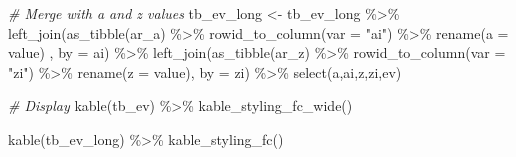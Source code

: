 \documentclass[
]{book}
\newenvironment{Shaded}{\begin{snugshade}}{\end{snugshade}}
\newcommand{\AttributeTok}[1]{\textcolor[rgb]{0.77,0.63,0.00}{#1}}
\newcommand{\CommentTok}[1]{\textcolor[rgb]{0.56,0.35,0.01}{\textit{#1}}}
\newcommand{\FunctionTok}[1]{\textcolor[rgb]{0.00,0.00,0.00}{#1}}
\newcommand{\NormalTok}[1]{#1}
\newcommand{\OtherTok}[1]{\textcolor[rgb]{0.56,0.35,0.01}{#1}}
\newcommand{\SpecialCharTok}[1]{\textcolor[rgb]{0.00,0.00,0.00}{#1}}
\newcommand{\StringTok}[1]{\textcolor[rgb]{0.31,0.60,0.02}{#1}}
\begin{document}
\begin{Shaded}
\begin{Highlighting}[]
\CommentTok{\# Merge with a and z values}
\NormalTok{tb\_ev\_long }\OtherTok{\textless{}{-}}\NormalTok{ tb\_ev\_long }\SpecialCharTok{\%\textgreater{}\%}
  \FunctionTok{left\_join}\NormalTok{(}\FunctionTok{as\_tibble}\NormalTok{(ar\_a) }\SpecialCharTok{\%\textgreater{}\%}
              \FunctionTok{rowid\_to\_column}\NormalTok{(}\AttributeTok{var =} \StringTok{"ai"}\NormalTok{) }\SpecialCharTok{\%\textgreater{}\%}
              \FunctionTok{rename}\NormalTok{(}\AttributeTok{a =}\NormalTok{ value)}
\NormalTok{              , }\AttributeTok{by =} \StringTok{\textquotesingle{}ai\textquotesingle{}}\NormalTok{) }\SpecialCharTok{\%\textgreater{}\%}
  \FunctionTok{left\_join}\NormalTok{(}\FunctionTok{as\_tibble}\NormalTok{(ar\_z) }\SpecialCharTok{\%\textgreater{}\%}
              \FunctionTok{rowid\_to\_column}\NormalTok{(}\AttributeTok{var =} \StringTok{"zi"}\NormalTok{) }\SpecialCharTok{\%\textgreater{}\%}
              \FunctionTok{rename}\NormalTok{(}\AttributeTok{z =}\NormalTok{ value),}
            \AttributeTok{by =} \StringTok{\textquotesingle{}zi\textquotesingle{}}\NormalTok{) }\SpecialCharTok{\%\textgreater{}\%}
  \FunctionTok{select}\NormalTok{(a,ai,z,zi,ev)}

\CommentTok{\# Display}
\FunctionTok{kable}\NormalTok{(tb\_ev) }\SpecialCharTok{\%\textgreater{}\%} \FunctionTok{kable\_styling\_fc\_wide}\NormalTok{()}
\end{Highlighting}
\end{Shaded}

\begin{table}[!h]
\centering
{}
\end{table}

\begin{Shaded}
\begin{Highlighting}[]
\FunctionTok{kable}\NormalTok{(tb\_ev\_long) }\SpecialCharTok{\%\textgreater{}\%} \FunctionTok{kable\_styling\_fc}\NormalTok{()}
\end{Highlighting}
\end{Shaded}
\end{document}
